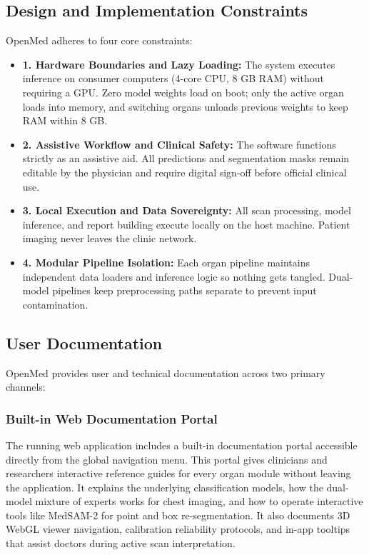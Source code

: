 \documentclass[12pt,a4paper]{report}
\begin{document}
\subsection{Design and Implementation Constraints}
OpenMed adheres to four core constraints:

\begin{itemize}[leftmargin=1.2em]
    \item \textbf{1. Hardware Boundaries and Lazy Loading:} The system executes inference on consumer computers (4-core CPU, 8 GB RAM) without requiring a GPU. Zero model weights load on boot; only the active organ loads into memory, and switching organs unloads previous weights to keep RAM within 8 GB.
    \item \textbf{2. Assistive Workflow and Clinical Safety:} The software functions strictly as an assistive aid. All predictions and segmentation masks remain editable by the physician and require digital sign-off before official clinical use.
    \item \textbf{3. Local Execution and Data Sovereignty:} All scan processing, model inference, and report building execute locally on the host machine. Patient imaging never leaves the clinic network.
    \item \textbf{4. Modular Pipeline Isolation:} Each organ pipeline maintains independent data loaders and inference logic so nothing gets tangled. Dual-model pipelines keep preprocessing paths separate to prevent input contamination.
\end{itemize}

\subsection{User Documentation}
OpenMed provides user and technical documentation across two primary channels:

\subsubsection{Built-in Web Documentation Portal}
The running web application includes a built-in documentation portal accessible directly from the global navigation menu. This portal gives clinicians and researchers interactive reference guides for every organ module without leaving the application. It explains the underlying classification models, how the dual-model mixture of experts works for chest imaging, and how to operate interactive tools like MedSAM-2 for point and box re-segmentation. It also documents 3D WebGL viewer navigation, calibration reliability protocols, and in-app tooltips that assist doctors during active scan interpretation.
\end{document}
